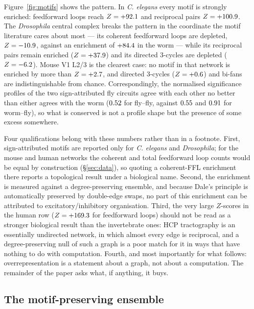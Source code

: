 Figure~\ref{fig:motifs} shows the pattern. In \textit{C. elegans} every motif is
strongly enriched: feedforward loops reach
$Z = +92.1$ and reciprocal pairs $Z = +100.9$. The \textit{Drosophila} central
complex breaks the pattern in the coordinate the motif literature cares about most ---
its coherent feedforward loops are depleted, $Z = -10.9$, against an enrichment
of $+84.4$ in the worm --- while its reciprocal pairs remain enriched
($Z = +37.9$) and its directed 3-cycles are depleted ($Z = -6.2$). Mouse
V1 L2/3 is the clearest case: no motif in that network is enriched by more than
$Z = +2.7$, and directed 3-cycles ($Z = +0.6$) and bi-fans are
indistinguishable from chance. Correspondingly, the normalised significance profiles of
the two sign-attributed fly circuits agree with each other no better than either agrees
with the worm ($0.52$ for fly--fly, against $0.55$ and $0.91$ for
worm--fly), so what is conserved is not a profile shape but the presence of some excess
somewhere.

Four qualifications belong with these numbers rather than in a footnote. First,
sign-attributed motifs are reported only for \textit{C. elegans} and \textit{Drosophila};
for the mouse and human networks the coherent and total feedforward loop counts would be
equal by construction (\S\ref{sec:data}), so quoting a coherent-FFL enrichment there
reports a topological result under a biological name. Second, the enrichment is measured
against a degree-preserving ensemble, and because Dale's principle is automatically
preserved by double-edge swaps, no part of this enrichment can be attributed to
excitatory/inhibitory organisation. Third, the very large $Z$-scores in the human row
($Z = +169.3$ for feedforward loops) should not be read as a stronger biological
result than the invertebrate ones: HCP tractography is an essentially undirected
network, in which almost every edge is reciprocal, and a degree-preserving null of such
a graph is a poor match for it in ways that have nothing to do with computation. Fourth,
and most importantly for what follows: overrepresentation is a statement about a graph,
not about a computation. The remainder of the paper asks what, if anything, it buys.

\subsection{The motif-preserving ensemble}
\label{sec:res-null}


